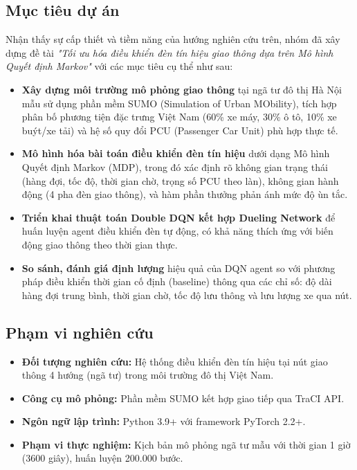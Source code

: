 \subsection{Mục tiêu dự án}

Nhận thấy sự cấp thiết và tiềm năng của hướng nghiên cứu trên, nhóm đã xây dựng đề tài \textit{"Tối ưu hóa điều khiển đèn tín hiệu giao thông dựa trên Mô hình Quyết định Markov"} với các mục tiêu cụ thể như sau:

\begin{itemize}
    \item \textbf{Xây dựng môi trường mô phỏng giao thông} tại ngã tư đô thị Hà Nội mẫu sử dụng phần mềm SUMO (Simulation of Urban MObility), tích hợp phân bố phương tiện đặc trưng Việt Nam (60\% xe máy, 30\% ô tô, 10\% xe buýt/xe tải) và hệ số quy đổi PCU (Passenger Car Unit) phù hợp thực tế.

    \item \textbf{Mô hình hóa bài toán điều khiển đèn tín hiệu} dưới dạng Mô hình Quyết định Markov (MDP), trong đó xác định rõ không gian trạng thái (hàng đợi, tốc độ, thời gian chờ, trọng số PCU theo làn), không gian hành động (4 pha đèn giao thông), và hàm phần thưởng phản ánh mức độ ùn tắc.

    \item \textbf{Triển khai thuật toán Double DQN kết hợp Dueling Network} để huấn luyện agent điều khiển đèn tự động, có khả năng thích ứng với biến động giao thông theo thời gian thực.

    \item \textbf{So sánh, đánh giá định lượng} hiệu quả của DQN agent so với phương pháp điều khiển thời gian cố định (baseline) thông qua các chỉ số: độ dài hàng đợi trung bình, thời gian chờ, tốc độ lưu thông và lưu lượng xe qua nút.
\end{itemize}

\subsection{Phạm vi nghiên cứu}

\begin{itemize}
    \item \textbf{Đối tượng nghiên cứu:} Hệ thống điều khiển đèn tín hiệu tại nút giao thông 4 hướng (ngã tư) trong môi trường đô thị Việt Nam.
    \item \textbf{Công cụ mô phỏng:} Phần mềm SUMO kết hợp giao tiếp qua TraCI API.
    \item \textbf{Ngôn ngữ lập trình:} Python 3.9+ với framework PyTorch 2.2+.
    \item \textbf{Phạm vi thực nghiệm:} Kịch bản mô phỏng ngã tư mẫu với thời gian 1 giờ (3600 giây), huấn luyện 200.000 bước.
\end{itemize}


